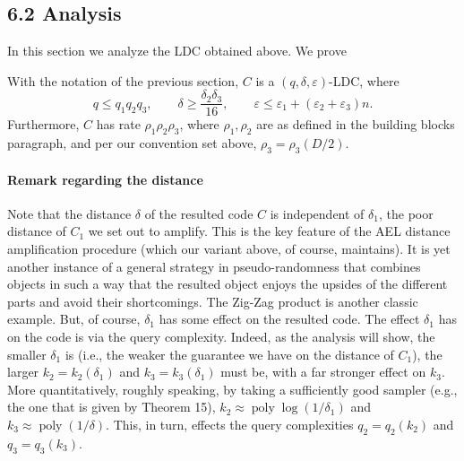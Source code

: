 \subsection*{6.2 Analysis}
In this section we analyze the LDC obtained above. We prove
\setcounter{nttheorem}{64}
\begin{ntproposition}
With the notation of the previous section, $C$ is a $(q,\delta,\varepsilon)$-LDC, where
\[q\leq q_1q_2q_3,\qquad\delta\geq\frac{\delta_2\delta_3}{16},\qquad\varepsilon\leq\varepsilon_1+(\varepsilon_2+\varepsilon_3)n.\]
Furthermore, $C$ has rate $\rho_1\rho_2\rho_3$, where $\rho_1,\rho_2$ are as defined in the building blocks paragraph, and per our convention set above, $\rho_3=\rho_3(D/2)$.
\end{ntproposition}
\paragraph{Remark regarding the distance}
Note that the distance $\delta$ of the resulted code $C$ is independent of $\delta_1$, the poor distance of $C_1$ we set out to amplify. This is the key feature of the AEL distance amplification procedure (which our variant above, of course, maintains). It is yet another instance of a general strategy in pseudo-randomness that combines objects in such a way that the resulted object enjoys the upsides of the different parts and avoid their shortcomings. The Zig-Zag product is another classic example. But, of course, $\delta_1$ has some effect on the resulted code. The effect $\delta_1$ has on the code is via the query complexity. Indeed, as the analysis will show, the smaller $\delta_1$ is (i.e., the weaker the guarantee we have on the distance of $C_1$), the larger $k_2=k_2(\delta_1)$ and $k_3=k_3(\delta_1)$ must be, with a far stronger effect on $k_3$. More quantitatively, roughly speaking, by taking a sufficiently good sampler (e.g., the one that is given by Theorem 15), $k_2\approx\operatorname{poly}\log(1/\delta_1)$ and $k_3\approx\operatorname{poly}(1/\delta)$. This, in turn, effects the query complexities $q_2=q_2(k_2)$ and $q_3=q_3(k_3)$.
